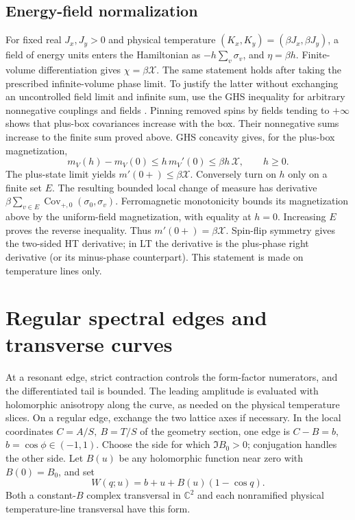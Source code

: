 \documentclass[11pt]{article}
\numberwithin{equation}{section}
\theoremstyle{definition}
\newcommand{\C}{\mathbb C}
\begin{document}
\subsection{Energy-field normalization}

For fixed real \(J_x,J_y>0\) and physical temperature
\((K_x,K_y)=(\beta J_x,\beta J_y)\), a field of energy units enters
the Hamiltonian as \(-h\sum_v\sigma_v\), and \(\eta=\beta h\).
Finite-volume differentiation gives \(\chi=\beta\mathcal X\).
The same statement holds after taking the prescribed infinite-volume
phase limit. To justify the latter without exchanging an uncontrolled
field limit and infinite sum, use the GHS inequality for arbitrary
nonnegative couplings and fields \cite[Theorem 1.5]{CGN}.
Pinning removed spins by fields tending to \(+\infty\) shows that
plus-box covariances increase with the box. Their nonnegative sums
increase to the finite sum proved above. GHS concavity gives, for
the plus-box magnetization,
\[
 m_V(h)-m_V(0)\le h\,m_V'(0)
       \le\beta h\,\mathcal X,\qquad h\ge0.
\]
The plus-state limit yields \(m'(0+)\le\beta\mathcal X\).
Conversely turn on \(h\) only on a finite set \(E\). The resulting
bounded local change of measure has derivative
\(\beta\sum_{v\in E}\operatorname{Cov}_{+,0}(\sigma_0,\sigma_v)\).
Ferromagnetic monotonicity bounds its magnetization above by the
uniform-field magnetization, with equality at \(h=0\).
Increasing \(E\) proves the reverse inequality. Thus
\(m'(0+)=\beta\mathcal X\). Spin-flip symmetry gives the two-sided
HT derivative; in LT the derivative is the plus-phase right
derivative (or its minus-phase counterpart).
This statement is made on temperature lines only.

\section{Regular spectral edges and transverse curves}
\label{ana:edges}

At a resonant edge, strict contraction controls the form-factor
numerators, and the differentiated tail is bounded. The leading
amplitude is evaluated with holomorphic anisotropy along the curve,
as needed on the physical temperature slices.
On a regular edge, exchange the two lattice axes if necessary.
In the local coordinates \(C=A/S,\ B=T/S\) of the geometry section,
one edge is \(C-B=b\), \(b=\cos\phi\in(-1,1)\).
Choose the side for which \(\Im B_0>0\); conjugation handles the
other side. Let \(B(u)\) be any holomorphic function near zero with
\(B(0)=B_0\), and set
\begin{equation}\label{ana:edgecurve}
 W(q;u)=b+u+B(u)(1-\cos q).
\end{equation}
Both a constant-\(B\) complex transversal in \(\C^2\) and each
nonramified physical temperature-line transversal have this form.
\end{document}
